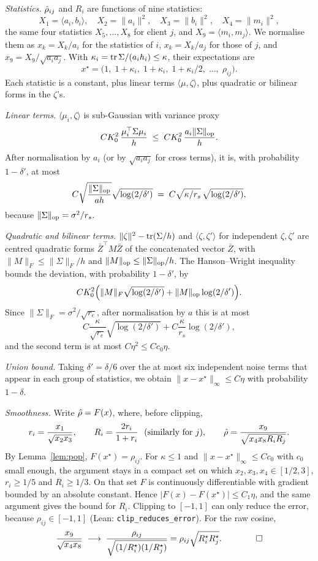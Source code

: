\emph{Statistics.} $\hat\rho_{ij}$ and $R_i$ are functions of nine statistics:
\[
X_1=\langle a_i,b_i\rangle,\quad X_2=\|a_i\|^2,\quad X_3=\|b_i\|^2,\quad X_4=\|m_i\|^2,
\]
the same four statistics $X_5,\dots,X_8$ for client $j$, and $X_9=\langle m_i,m_j\rangle$. We normalise them as $x_k=X_k/a_i$ for the statistics of $i$, $x_k=X_k/a_j$ for those of $j$, and $x_9=X_9/\sqrt{a_ia_j}$. With $\kappa_i=\operatorname{tr}\Sigma/(a_ih_i)\le\kappa$, their expectations are
\[
x^\star=\big(1,\;1+\kappa_i,\;1+\kappa_i,\;1+\kappa_i/2,\;\dots,\;\rho_{ij}\big).
\]
Each statistic is a constant, plus linear terms $\langle\mu,\zeta\rangle$, plus quadratic or bilinear forms in the $\zeta$'s.

\emph{Linear terms.} $\langle\mu_i,\zeta\rangle$ is sub-Gaussian with variance proxy
\[
CK_0^2\,\frac{\mu_i^\top\Sigma\mu_i}{h}\;\le\;CK_0^2\,\frac{a_i\|\Sigma\|_{\mathrm{op}}}{h}.
\]
After normalisation by $a_i$ (or by $\sqrt{a_ia_j}$ for cross terms), it is, with probability $1-\delta'$, at most
\[
C\sqrt{\frac{\|\Sigma\|_{\mathrm{op}}}{ah}}\sqrt{\log(2/\delta')}
\;=\;C\sqrt{\kappa/r_s}\,\sqrt{\log(2/\delta')},
\]
because $\|\Sigma\|_{\mathrm{op}}=\sigma^2/r_s$.

\emph{Quadratic and bilinear terms.} $\|\zeta\|^2-\operatorname{tr}(\Sigma/h)$ and $\langle\zeta,\zeta'\rangle$ for independent $\zeta,\zeta'$ are centred quadratic forms $\bar Z^\top M\bar Z$ of the concatenated vector $\bar Z$, with $\|M\|_F\le\|\Sigma\|_F/h$ and $\|M\|_{\mathrm{op}}\le\|\Sigma\|_{\mathrm{op}}/h$. The Hanson--Wright inequality~\citep{rudelson2013hansonwright} bounds the deviation, with probability $1-\delta'$, by
\[
C K_0^2\Big(\|M\|_F\sqrt{\log(2/\delta')}+\|M\|_{\mathrm{op}}\log(2/\delta')\Big).
\]
Since $\|\Sigma\|_F=\sigma^2/\sqrt{r_e}$, after normalisation by $a$ this is at most
\[
C\frac{\kappa}{\sqrt{r_e}}\sqrt{\log(2/\delta')}+C\frac{\kappa}{r_s}\log(2/\delta'),
\]
and the second term is at most $C\eta^2\le Cc_0\eta$.

\emph{Union bound.} Taking $\delta'=\delta/6$ over the at most six independent noise terms that appear in each group of statistics, we obtain $\|x-x^\star\|_\infty\le C\eta$ with probability $1-\delta$.

\emph{Smoothness.} Write $\hat\rho=F(x)$, where, before clipping,
\[
r_i=\frac{x_1}{\sqrt{x_2x_3}},\qquad R_i=\frac{2r_i}{1+r_i}\ \ \text{(similarly for $j$)},\qquad
\hat\rho=\frac{x_9}{\sqrt{x_4x_8R_iR_j}}.
\]
By Lemma~\ref{lem:pop}, $F(x^\star)=\rho_{ij}$. For $\kappa\le1$ and $\|x-x^\star\|_\infty\le Cc_0$ with $c_0$ small enough, the argument stays in a compact set on which $x_2,x_3,x_4\in[1/2,3]$, $r_i\ge1/5$ and $R_i\ge1/3$. On that set $F$ is continuously differentiable with gradient bounded by an absolute constant. Hence $|F(x)-F(x^\star)|\le C_1\eta$, and the same argument gives the bound for $R_i$. Clipping to $[-1,1]$ can only reduce the error, because $\rho_{ij}\in[-1,1]$ (Lean: \texttt{clip\_reduces\_error}). For the raw cosine,
\[
\frac{x_9}{\sqrt{x_4x_8}}\;\longrightarrow\;\frac{\rho_{ij}}{\sqrt{(1/R^\star_i)(1/R^\star_j)}}=\rho_{ij}\sqrt{R_i^\star R_j^\star}.
\qquad\qed
\]

